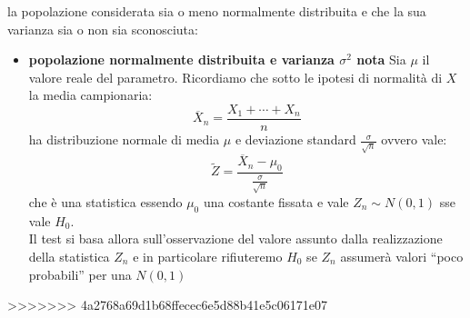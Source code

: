 \documentclass[a4paper,12pt, oneside]{book}
\begin{document}
la popolazione considerata sia o meno normalmente distribuita e che la sua varianza
sia o non sia sconosciuta:
\begin{itemize}
\item \textbf{popolazione normalmente distribuita e varianza $\sigma^2$ nota}
  Sia $\mu$ il valore reale del parametro. Ricordiamo che sotto le ipotesi di normalità di $X$
  la media campionaria:
  \[\overline{X}_n=\frac{X_1+\cdots+X_n}{n}\]
  ha distribuzione normale di media $\mu$ e deviazione standard $\frac{\sigma}{\sqrt{n}}$ ovvero vale:
  \[\widetilde{Z}=\frac{\overline{X}_n-\mu_0}{\frac{\sigma}{\sqrt{n}}}\]
  che è una statistica essendo $\mu_0$ una costante fissata e vale $Z_n\sim N(0,1)$ sse vale $H_0$.\\
  Il test si basa allora sull’osservazione del valore assunto dalla realizzazione della
statistica $Z_n$ e in particolare rifiuteremo $H_0$ se $Z_n$ assumerà valori ``poco probabili'' per una $N(0,1)$ 
\end{itemize}
>>>>>>> 4a2768a69d1b68ffecec6e5d88b41e5c06171e07
\end{document}
